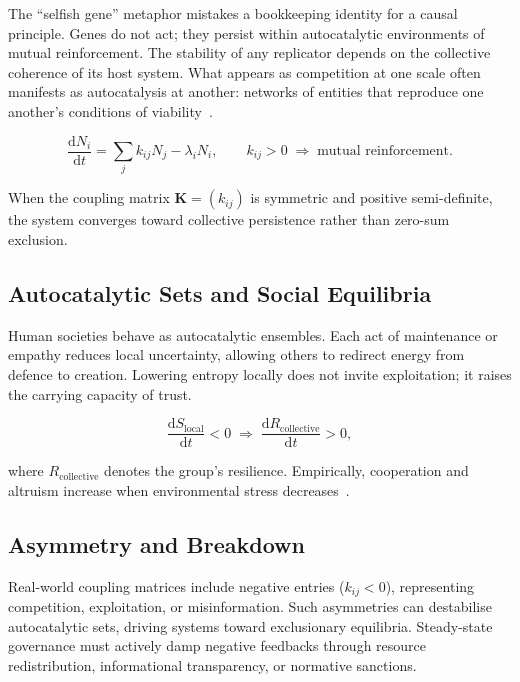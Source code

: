 \documentclass[12pt,a4paper]{article}
\theoremstyle{definition}
\newcommand{\ddt}[1]{\frac{\mathrm{d}#1}{\mathrm{d}t}}
\begin{document}
The ``selfish gene'' metaphor mistakes a bookkeeping identity for a causal
principle.  Genes do not act; they persist within autocatalytic environments
of mutual reinforcement.  The stability of any replicator depends on the
collective coherence of its host system.  What appears as competition at one
scale often manifests as autocatalysis at another: networks of entities that
reproduce one another's conditions of viability~\citep{capraluisi2021,morin2008}.

\begin{equation}
  \ddt{N_i} = \sum_j k_{ij} N_j - \lambda_i N_i,
  \qquad k_{ij} > 0 \;\Longrightarrow\; \text{mutual reinforcement.}
  \label{eq:autocatalysis}
\end{equation}

When the coupling matrix $\mathbf{K} = (k_{ij})$ is symmetric and positive
semi-definite, the system converges toward collective persistence rather than
zero-sum exclusion.

\subsection{Autocatalytic Sets and Social Equilibria}

Human societies behave as autocatalytic ensembles.  Each act of maintenance
or empathy reduces local uncertainty, allowing others to redirect energy from
defence to creation.  Lowering entropy locally does not invite exploitation;
it raises the carrying capacity of trust.

\begin{equation}
  \ddt{S_{\mathrm{local}}} < 0
  \;\Longrightarrow\;
  \ddt{R_{\mathrm{collective}}} > 0,
\end{equation}

where $R_{\mathrm{collective}}$ denotes the group's resilience.  Empirically,
cooperation and altruism increase when environmental stress
decreases~\citep{bernhard2021}.

\subsection{Asymmetry and Breakdown}

Real-world coupling matrices include negative entries ($k_{ij} < 0$),
representing competition, exploitation, or misinformation.  Such asymmetries
can destabilise autocatalytic sets, driving systems toward exclusionary
equilibria.  Steady-state governance must actively damp negative feedbacks
through resource redistribution, informational transparency, or normative
sanctions.
\end{document}
